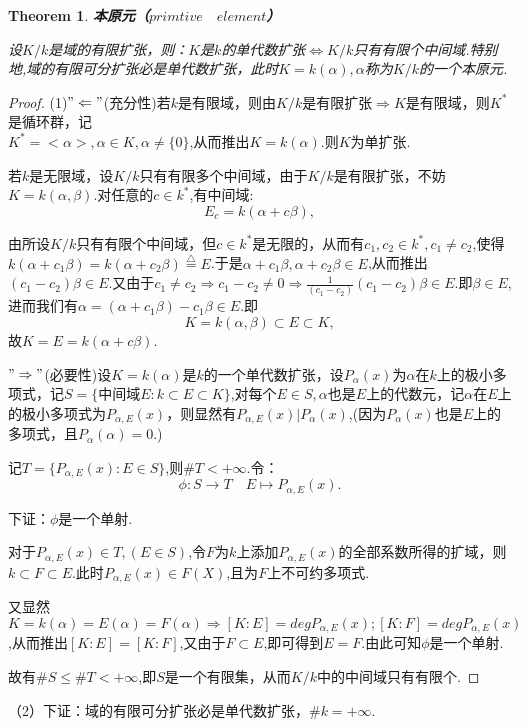 \documentclass[UTF8]{article}
\newtheorem{thm}{Theorem}[section]
\begin{document}
\begin{thm}

\textbf{\quad 本原元（$primtive\quad element$）}

设$K/k$是域的有限扩张，则：$K$是$k$的单代数扩张$\Longleftrightarrow K/k$只有有限个中间域.特别地,域的有限可分扩张必是单代数扩张，此时$K=k(\alpha),\alpha$称为$K/k$的一个本原元.
\end{thm}
\begin{proof}
(1)$"\Leftarrow"$(充分性)若$k$是有限域，则由$K/k$是有限扩张$\Rightarrow K$是有限域，则$K^*$是循环群，记\\%
$K^*=<\alpha>,\alpha\in K,\alpha\ne\{0\}$,从而推出$K=k(\alpha)$.则$K$为单扩张.

若$k$是无限域，设$K/k$只有有限多个中间域，由于$K/k$是有限扩张，不妨$K=k(\alpha,\beta)$.对任意的$c\in k^*$,有中间域:$$E_c=k(\alpha+c\beta),$$

由所设$K/k$只有有限个中间域，但$c\in k^*$是无限的，从而有$c_1,c_2\in k^*,c_1\ne c_2$,使得$k(\alpha+c_1\beta)=k(\alpha+c_2\beta)\stackrel{\bigtriangleup}{=}E$.于是$\alpha+c_1\beta,\alpha+c_2\beta\in E$,从而推出$(c_1-c_2)\beta\in E$.又由于$c_1\ne c_2\Rightarrow c_1-c_2\ne 0\Rightarrow\frac{1}{(c_1-c_2)}(c_1-c_2)\beta\in E$.即$\beta\in E$,进而我们有$\alpha=(\alpha+c_1\beta)-c_1\beta\in E$.即$$K=k(\alpha,\beta)\subset E\subset K,$$故$K=E=k(\alpha + c\beta)$.

$"\Rightarrow"$(必要性)设$K=k(\alpha)$是$k$的一个单代数扩张，设$P_{\alpha}(x)$为$\alpha$在$k$上的极小多项式，记$S=\{$中间域$E:k\subset E\subset K\}$,对每个$E\in S,\alpha$也是$E$上的代数元，记$\alpha$在$E$上的极小多项式为$P_{\alpha,E}(x)$，则显然有$P_{\alpha,E}(x)|P_{\alpha}(x)$,(因为$P_{\alpha}(x)$也是$E$上的多项式，且$P_{\alpha}(\alpha)=0$.)

记$T=\{P_{\alpha,E}(x):E\in S\}$,则$\# T< +\infty$.令：$$\phi:S\rightarrow  T\quad E\mapsto P_{\alpha,E}(x).$$

下证：$\phi$是一个单射.

对于$P_{\alpha,E}(x)\in T,(E\in S)$,令$F$为$k$上添加$P_{\alpha,E}(x)$的全部系数所得的扩域，则$k\subset  F \subset E$.此时$P_{\alpha,E}(x)\in F(X)$,且为$F$上不可约多项式.

又显然$K=k(\alpha)=E(\alpha)=F(\alpha)\Rightarrow[K:E]=degP_{\alpha,E}(x);[K:F]=degP_{\alpha,E}(x)$,从而推出$[K:E]=[K:F]$,又由于$F\subset E$,即可得到$E=F$.由此可知$\phi$是一个单射.

故有$\#S\le\#T< +\infty$,即$S$是一个有限集，从而$K/k$中的中间域只有有限个.
\end{proof}
（2）下证：域的有限可分扩张必是单代数扩张，$\#k= +\infty.$
\end{document}
